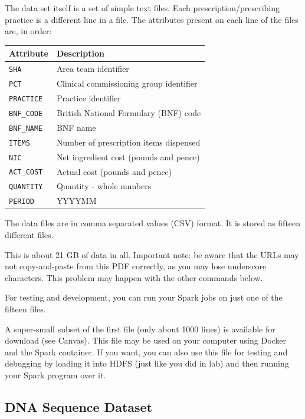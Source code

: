\documentclass[11pt]{article}
\renewcommand\:{\colon} %
\begin{document}
The data set itself is a set of simple text files.  Each prescription/prescribing practice is a different line in a file. 
The attributes present on each line of the files are, in order:

\begin{center}
\begin{tabular}{ |l|l| } 
\hline
Attribute & Description \\
\hline
\texttt{SHA} &	Area team identifier  \\
\texttt{PCT}	 & Clinical commissioning group identifier  \\
\texttt{PRACTICE}	 & Practice identifier  \\
\texttt{BNF\_CODE}	 &British National Formulary (BNF) code  \\
\texttt{BNF\_NAME}	 & BNF name  \\
\texttt{ITEMS}	 & Number of prescription items dispensed  \\
\texttt{NIC}	 & Net ingredient cost (pounds and pence)  \\
\texttt{ACT\_COST}	 &Actual cost (pounds and pence)  \\
\texttt{QUANTITY}	 & Quantity - whole numbers \\
\texttt{PERIOD}	 &YYYYMM  \\
\hline
\end{tabular}
\end{center}

The data files are in comma separated values (CSV) format.
 It is stored as fifteen different files.

\noindent This is about 21 GB of data in all.  Important note: be aware that the URLs may not copy-and-paste from
this PDF correctly, as you may
lose underscore characters.  This problem may happen with the other commands below.


\noindent For testing and development, you can run your Spark jobs on just one of the fifteen files. 

A super-small subset of the first file (only about 1000 lines) is available for download (see Canvas).  This file may be used on your computer using Docker and the Spark container. If you want, you can also use this file for testing and debugging by loading it into HDFS (just like you did in lab) and then running your Spark program over it. 


\subsection{DNA Sequence Dataset}
\end{document}
